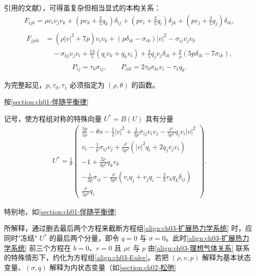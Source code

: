 ﻿\documentclass[../../main.tex]{subfiles}
\begin{document}
引用的文献），可得虽复杂但相当显式的本构关系：
\begin{align}
F_{ijk}=\rho v_{i}v_{j}v_{k}+\left(pv_{k}+\frac{2}{5}q_{k}\right)\delta_{ij}+\left(pv_{i}+\frac{2}{5}q_{i}\right)\delta_{jk}+\left(pv_{j}+\frac{2}{5}q_{j}\right)\delta_{ik},
\label{align:ch03-Fijk}
\end{align}
\begin{align}
\begin{aligned}
F_{jjik}&=\left(\rho|v|^{2}+7p\right)v_{i}v_{k}+\left(p\delta_{ik}-\sigma_{ik}\right)|v|^{2}-\sigma_{ij}v_{j}v_{k}\\
&\quad-\sigma_{kj}v_{j}v_{i}+\frac{14}{5}\left(q_{i}v_{k}+q_{k}v_{i}\right)+\frac{4}{5}q_{j}v_{j}\delta_{ik}+\frac{p}{\rho}\left(5p\delta_{ik}-7\sigma_{ik}\right),
\end{aligned}
\label{align:ch03-Fjjik}
\end{align}
\begin{align}
P_{ij}=\tau_{0}\sigma_{ij},\qquad P_{iik}=2\tau_{0}\sigma_{ki}v_{i}-\tau_{1}q_{k}.
\label{align:ch03-Pij}
\end{align}

为完整起见，$p,\tau_{0},\tau_{1}$ 必须指定为 $(\rho,\theta)$ 的函数。

按\cref{section:ch01-伴随平衡律}%

记号，使方程组对称的特殊向量 $U^{*}=B(U)$ 具有分量
\begin{align}
U^{*}=\frac{1}{\theta}
\begin{pmatrix}
\frac{5p}{2\rho}-\theta s-\frac{1}{2}|v|^{2}+\frac{1}{2p}\sigma_{ij}v_{i}v_{j}-\frac{\rho}{5p^{2}}q_{i}v_{i}|v|^{2}\\
v_{i}-\frac{1}{p}\sigma_{ij}v_{j}+\frac{\rho}{5p^{2}}\left(|v|^{2}q_{i}+2q_{j}v_{j}v_{i}\right)\\
-1+\frac{2\rho}{3p^{2}}q_{k}v_{k}\\
-\frac{1}{2p}\sigma_{ij}-\frac{\rho}{5p^{2}}\left(v_{i}q_{j}+v_{j}q_{i}-\frac{2}{3}v_{k}q_{k}\delta_{ij}\right)\\
\frac{\rho}{5p^{2}}q_{i}
\end{pmatrix}.
\label{align:ch03-对称变量}
\end{align}

特别地，如\cref{section:ch01-伴随平衡律}%

所解释，通过删去最后两个方程来截断方程组\eqref{align:ch03-扩展热力学系统} 时，应同时"冻结" $U^{*}$ 的最后两个分量，即令 $q=0$ 与 $\sigma=0$。此时\eqref{align:ch03-扩展热力学系统} 前三个方程在 $b=0$、$r=0$ 且 $\rho\varepsilon$ 与 $p$ 由\eqref{align:ch03-理想气体关系} 联系的特殊情形下，约化为方程组\eqref{align:ch03-Euler}。若把 $(\rho,v,p)$ 解释为基本状态变量、$(\sigma,q)$ 解释为内状态变量（如\cref{section:ch02-松弛}%
\end{document}

